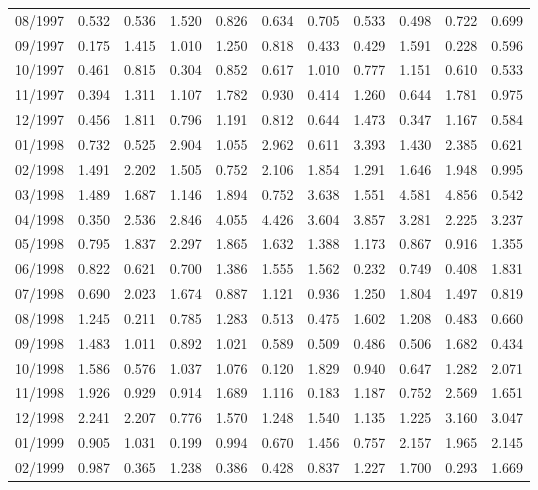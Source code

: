 \begin{tabular}{lrrrrrrrrrr}
08/1997 &  0.532 &  0.536 &  1.520 &  0.826 &  0.634 &  0.705 &  0.533 &  0.498 &  0.722 &  0.699 \\
09/1997 &  0.175 &  1.415 &  1.010 &  1.250 &  0.818 &  0.433 &  0.429 &  1.591 &  0.228 &  0.596 \\
10/1997 &  0.461 &  0.815 &  0.304 &  0.852 &  0.617 &  1.010 &  0.777 &  1.151 &  0.610 &  0.533 \\
11/1997 &  0.394 &  1.311 &  1.107 &  1.782 &  0.930 &  0.414 &  1.260 &  0.644 &  1.781 &  0.975 \\
12/1997 &  0.456 &  1.811 &  0.796 &  1.191 &  0.812 &  0.644 &  1.473 &  0.347 &  1.167 &  0.584 \\
01/1998 &  0.732 &  0.525 &  2.904 &  1.055 &  2.962 &  0.611 &  3.393 &  1.430 &  2.385 &  0.621 \\
02/1998 &  1.491 &  2.202 &  1.505 &  0.752 &  2.106 &  1.854 &  1.291 &  1.646 &  1.948 &  0.995 \\
03/1998 &  1.489 &  1.687 &  1.146 &  1.894 &  0.752 &  3.638 &  1.551 &  4.581 &  4.856 &  0.542 \\
04/1998 &  0.350 &  2.536 &  2.846 &  4.055 &  4.426 &  3.604 &  3.857 &  3.281 &  2.225 &  3.237 \\
05/1998 &  0.795 &  1.837 &  2.297 &  1.865 &  1.632 &  1.388 &  1.173 &  0.867 &  0.916 &  1.355 \\
06/1998 &  0.822 &  0.621 &  0.700 &  1.386 &  1.555 &  1.562 &  0.232 &  0.749 &  0.408 &  1.831 \\
07/1998 &  0.690 &  2.023 &  1.674 &  0.887 &  1.121 &  0.936 &  1.250 &  1.804 &  1.497 &  0.819 \\
08/1998 &  1.245 &  0.211 &  0.785 &  1.283 &  0.513 &  0.475 &  1.602 &  1.208 &  0.483 &  0.660 \\
09/1998 &  1.483 &  1.011 &  0.892 &  1.021 &  0.589 &  0.509 &  0.486 &  0.506 &  1.682 &  0.434 \\
10/1998 &  1.586 &  0.576 &  1.037 &  1.076 &  0.120 &  1.829 &  0.940 &  0.647 &  1.282 &  2.071 \\
11/1998 &  1.926 &  0.929 &  0.914 &  1.689 &  1.116 &  0.183 &  1.187 &  0.752 &  2.569 &  1.651 \\
12/1998 &  2.241 &  2.207 &  0.776 &  1.570 &  1.248 &  1.540 &  1.135 &  1.225 &  3.160 &  3.047 \\
01/1999 &  0.905 &  1.031 &  0.199 &  0.994 &  0.670 &  1.456 &  0.757 &  2.157 &  1.965 &  2.145 \\
02/1999 &  0.987 &  0.365 &  1.238 &  0.386 &  0.428 &  0.837 &  1.227 &  1.700 &  0.293 &  1.669 \\

\end{tabular}
